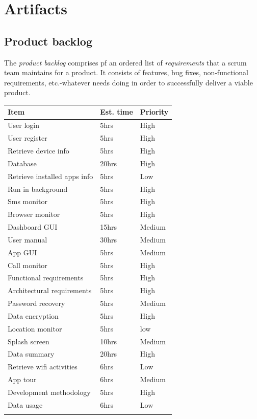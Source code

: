 \documentclass[hidelinks, 12pt, oneside]{article}
\begin{document}
 	\section{Artifacts}
 	\subsection{Product backlog}
 	The \emph{product backlog} comprises pf an ordered list of \emph{requirements} that a scrum team maintains for a product. It consists of features, bug fixes, non-functional 
 	requirements, etc.-whatever needs doing in order to successfully deliver a viable product.\newline\newline 	
 	\begin{tabular}{|p{6cm}|p{4cm}|p{3cm}|}
			\textbf{Item} & \textbf{Est. time} & \textbf{Priority}\\
			\hline
			User login & 5hrs & High\\
			\hline
			User register & 5hrs & High\\
			\hline
			Retrieve device info & 5hrs & High\\
			\hline
			Database & 20hrs & High\\
			\hline
			Retrieve installed apps info & 5hrs & Low\\
			\hline
			Run in background & 5hrs & High\\
			\hline
			Sms monitor & 5hrs & High\\
			\hline
			Browser monitor & 5hrs & High\\
			\hline
			Dashboard GUI & 15hrs & Medium\\
			\hline
			User manual & 30hrs & Medium\\
			\hline
			App GUI & 5hrs & Medium\\
			\hline
			Call monitor & 5hrs & High\\
			\hline
			Functional requirements & 5hrs & High\\
			\hline
			Architectural requirements & 5hrs & High\\
			\hline
			Password recovery & 5hrs & Medium\\
			\hline
			Data encryption & 5hrs & High\\
			\hline
			Location monitor & 5hrs & low \\
			\hline
			Splash screen & 10hrs & Medium\\
			\hline
			Data summary & 20hrs & High\\
			\hline
			Retrieve wifi activities & 6hrs & Low\\
			\hline
			App tour & 6hrs & Medium\\
			\hline
			Development methodology & 5hrs & High\\
			\hline
			Data usage & 6hrs & Low\\
			\hline
			&&\\
			\hline
		\end{tabular}\newpage
		
\end{document}
